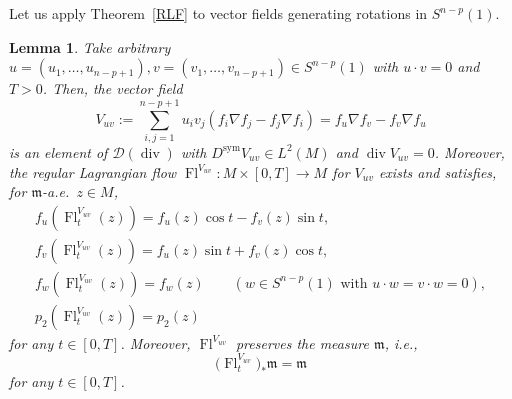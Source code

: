 \documentclass[pdftex]{sigma}
\numberwithin{equation}{section}
\newtheorem{Lem}[Thm]{Lemma}
\theoremstyle{definition}
\newcommand{\sym}{\operatorname{sym}}
\newcommand{\Fl}{\operatorname{Fl}}
\newcommand{\mf}{\mathfrak{m}}
\newcommand{\Div}{\operatorname{div}}
\newcommand{\D}{\mathcal{D}}
\begin{document}
Let us apply Theorem~\ref{RLF} to vector fields generating rotations in $S^{n-p}(1)$.
\begin{Lem}
Take arbitrary $u=(u_1,\ldots,u_{n-p+1}),v=(v_1,\ldots,v_{n-p+1})\in S^{n-p}(1)$ with $u\cdot v=0$ and $T>0$.
Then, the vector field
\[
V_{u v}:=\sum_{i,j=1}^{n-p+1}u_i v_j(f_i\nabla f_j-f_j\nabla f_i)=f_u\nabla f_v-f_v\nabla f_u
\]
is an element of $\D(\Div)$ with $D^{\sym} V_{u v}\in L^2(M)$ and $\Div V_{u v}=0$.
Moreover, the regular Lag\-ran\-gian flow $\Fl^{V_{u v}}\colon M\times [0,T]\to M$ for $V_{ u v}$ exists and satisfies, for $\mf$-a.e.\ $z\in M$,
\begin{gather*}
f_u(\Fl^{V_{u v}}_t(z))=f_u(z) \cos t- f_v(z)\sin t,
\\
f_v(\Fl^{V_{u v}}_t(z))=f_u(z) \sin t+ f_v(z)\cos t,
\\
f_w(\Fl^{V_{u v}}_t(z))=f_w(z)\qquad (w\in S^{n-p}(1)\text{ with }u\cdot w=v\cdot w=0),
\\
p_2(\Fl^{V_{u v}}_t(z))=p_2(z)
\end{gather*}
for any $t\in[0,T]$.
Moreover,
$\Fl^{V_{u v}}$ preserves the measure $\mf$, i.e.,
\[
\big(\Fl^{V_{u v}}_t\big)_\ast \mf=\mf
\]
for any $t\in[0,T]$.
\end{Lem}
\end{document}
